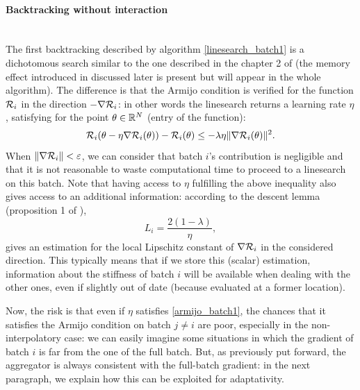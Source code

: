 \paragraph{Backtracking without interaction}
~~\\
The first backtracking described by algorithm \ref{linesearch_batch1} is a dichotomous search similar to the one described in the chapter 2 of \cite{Bilel_thesis} (the memory effect introduced in \cite{Rondepierre,Lyap_Theory_Bilel} discussed later is present but will appear in the whole algorithm). The difference is that the Armijo condition is verified for the function $\mathcal{R}_i$ in the direction $-\nabla \mathcal{R}_i$: in other words the linesearch returns a learning rate $\eta$, satisfying for the point $\theta \in \mathbb{R}^N$ (entry of the function):
\begin{equation}
	\mathcal{R}_i(\theta-\eta\nabla \mathcal{R}_i(\theta))-\mathcal{R}_i(\theta) \leq -\lambda \eta \|\nabla \mathcal{R}_i(\theta)\|^2.
	\label{armijo_batch1}
\end{equation}
When $\|\nabla \mathcal{R}_i\|<\varepsilon$, we can consider that batch $i$'s contribution is negligible and that it is not reasonable to waste computational time to proceed to a linesearch on this batch. 
Note that having access to $\eta$ fulfilling the above inequality also gives access to an additional information: according to the descent lemma (proposition 1 of \cite{Lyap_Theory_Bilel}), 
\begin{equation}
  \label{L_i}
  L_i=\frac{2(1-\lambda)}{\eta},
\end{equation}
gives an estimation for the local Lipschitz constant of $\nabla \mathcal{R}_i$ in the considered direction.
This typically means that if we store this (scalar) estimation, information about the stiffness of
batch $i$ will be available when dealing with the other ones, even if slightly out of date (because evaluated at a former location).  


Now, the risk is that even if $\eta$ satisfies \eqref{armijo_batch1}, the chances that it satisfies the Armijo condition on batch $j\neq i$ are poor, especially in the non-interpolatory
case: we can easily imagine some situations in which the gradient of batch $i$ is far from the one of the full batch. 
But, as previously put forward, the aggregator is always consistent with the full-batch gradient: in the next paragraph, we explain how this can be exploited for adaptativity. 


